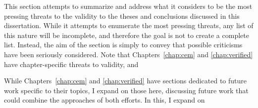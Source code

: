 This section attempts to summarize and address what it considers to be the most
pressing threats to the validity to the theses and conclusions discussed in this
dissertation. While it attempts to enumerate the most pressing threats, any list
of this nature will be incomplete, and therefore the goal is not to create a
complete list. Instead, the aim of the section is simply to convey that possible
criticisms have been seriously considered. Note that Chapters~\ref{chap:cem} and
\ref{chap:verified} have chapter-specific threats to validity, and  

While Chapters~\ref{chap:cem} and \ref{chap:verified} have sections dedicated to
future work specific to their topics, I expand on those here, discussing future
work that could combine the approaches of both efforts. In this, I expand on 


